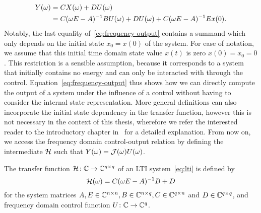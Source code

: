 \begin{equation}\label{eq:frequency-output}
    \begin{aligned}
        Y(\omega) &= C X(\omega) + D U(\omega) \\
        &= C (\omega E - A)^{-1} B U(\omega) + D U(\omega) + C (\omega E - A)^{-1} E x(0).
    \end{aligned}
\end{equation}
Notably, the last equality of~\eqref{eq:frequency-output} contains a summand which only depends on the initial state $x_0 = x(0)$ of the system.
For ease of notation, we assume that this initial time domain state value $x(t)$ is zero $x(0) = x_0 = 0$.
This restriction is a sensible assumption, because it corresponds to a system that initially contains no energy and can only be interacted with through the control.
Equation~\eqref{eq:frequency-output} thus shows how we can directly compute the output of a system under the influence of a control without having to consider the internal state representation.
More general definitions can also incorporate the initial state dependency in the transfer function, however this is not necessary in the context of this thesis, wherefore we refer the interested reader to the introductory chapter in~\cite{Benner2017} for a detailed explanation.
From now on, we access the frequency domain control-output relation by defining the intermediate $\mathcal{H}$ such that $Y(\omega) = \mathcal{J}(\omega) U(\omega)$.

\begin{definition}\label{def:transfer-function}
    The transfer function $\mathcal{H} \colon \mathbb{C} \to \mathbb{C}^{q \times q}$ of an \ac{LTI} system~\eqref{eq:lti} is defined by
    \begin{equation}\label{eq:transfer-function}
        \mathcal{H}(\omega) = C (\omega E - A)^{-1} B + D
    \end{equation}
    for the system matrices $A, E \in \mathbb{C}^{n \times n}, B \in \mathbb{C}^{n \times q}, C \in \mathbb{C}^{q \times n}$ and $D \in \mathbb{C}^{q \times q}$, and frequency domain control function $U \colon \mathbb{C} \to \mathbb{C}^{q}$.
\end{definition}

